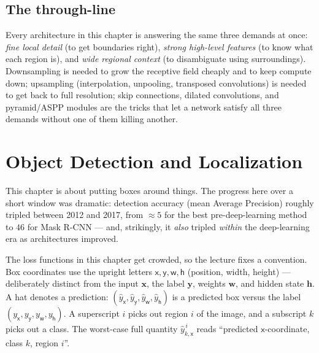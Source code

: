\documentclass[11pt, oneside]{book}
\newcommand{\weights}{\mathbf{w}}
\newcommand{\xvec}{\mathbf{x}}
\newcommand{\yvec}{\mathbf{y}}
\newcommand{\hvec}{\mathbf{h}}
\begin{document}
\section{The through-line}

Every architecture in this chapter is answering the same three demands at once:
\emph{fine local detail} (to get boundaries right), \emph{strong high-level
features} (to know what each region is), and \emph{wide regional context} (to
disambiguate using surroundings). Downsampling is needed to grow the receptive
field cheaply and to keep compute down; upsampling (interpolation, unpooling,
transposed convolutions) is needed to get back to full resolution; skip
connections, dilated convolutions, and pyramid/ASPP modules are the tricks that
let a network satisfy all three demands without one of them killing another.


\chapter{Object Detection and Localization}

This chapter is about putting boxes around things. The progress here over a short
window was dramatic: detection accuracy (mean Average Precision) roughly tripled
between 2012 and 2017, from $\approx 5$ for the best pre-deep-learning method to
$46$ for Mask R-CNN --- and, strikingly, it \emph{also} tripled \emph{within}
the deep-learning era as architectures improved.

\begin{notebox}[title={A note on notation}]
The loss functions in this chapter get crowded, so the lecture fixes a
convention. Box coordinates use the upright letters $\mathsf{x},\mathsf{y},
\mathsf{w},\mathsf{h}$ (position, width, height) --- deliberately distinct from
the input $\xvec$, the label $\yvec$, weights $\weights$, and hidden state
$\hvec$. A hat denotes a prediction: $(\hat{y}_\mathsf{x},\hat{y}_\mathsf{y},
\hat{y}_\mathsf{w},\hat{y}_\mathsf{h})$ is a predicted box versus the label
$(y_\mathsf{x},y_\mathsf{y},y_\mathsf{w},y_\mathsf{h})$. A superscript $i$ picks
out region $i$ of the image, and a subscript $k$ picks out a class. The
worst-case full quantity $\hat{y}^{\,i}_{k,\mathsf{x}}$ reads ``predicted
$\mathsf{x}$-coordinate, class $k$, region $i$''.
\end{notebox}
\end{document}
